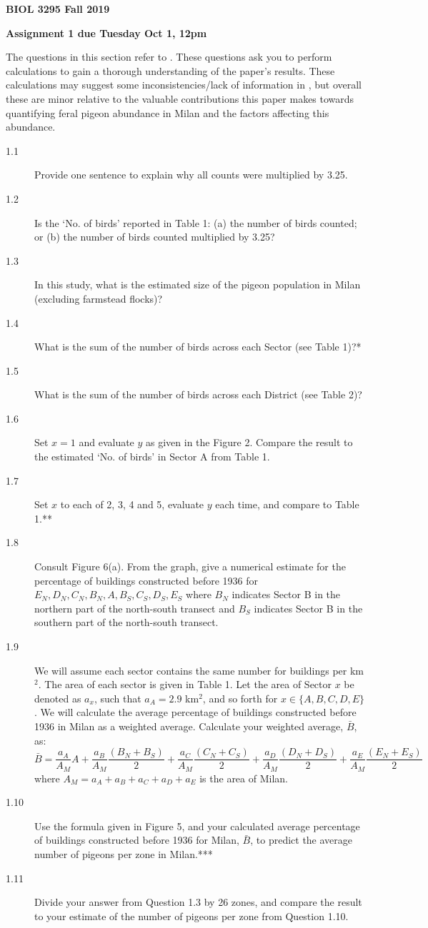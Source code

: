 \documentclass[11pt, oneside]{article}   	%
\begin{document}
\textbf{BIOL 3295 Fall 2019}

\textbf{Assignment 1 due Tuesday Oct 1, 12pm}

The questions in this section refer to \cite{Sacchi}. These questions ask you to perform calculations to gain a thorough understanding of the paper's results. These calculations may suggest some inconsistencies/lack of information in \cite{Sacchi}, but overall these are minor relative to the valuable contributions this paper makes towards quantifying feral pigeon abundance in Milan and the factors affecting this abundance. 

\begin{description}
\item[1.1] Provide one sentence to explain why all counts were multiplied by 3.25.
\item[1.2] Is the `No. of birds' reported in Table 1: (a) the number of birds counted; or (b) the number of birds counted multiplied by 3.25?
\item[1.3] In this study, what is the estimated size of the pigeon population in Milan (excluding farmstead flocks)?
\item[1.4] What is the sum of the number of birds across each Sector (see Table 1)?*
\item[1.5] What is the sum of the number of birds across each District (see Table 2)? 
\item[1.6] Set $x = 1$ and evaluate $y$ as given in the Figure 2. Compare the result to the estimated `No. of birds' in Sector A from Table 1.
\item[1.7] Set $x$ to each of 2, 3, 4 and 5, evaluate $y$ each time, and compare to Table 1.**
\item[1.8] Consult Figure 6(a). From the graph, give a numerical estimate for the percentage of buildings constructed before 1936 for $E_N, D_N, C_N, B_N, A, B_S, C_S, D_S, E_S$ where $B_N$ indicates Sector B in the northern part of the north-south transect and $B_S$ indicates Sector B in the southern part of the north-south transect.
\item[1.9] We will assume each sector contains the same number for buildings per km$^2$. The area of each sector is given in Table 1. Let the area of Sector $x$ be denoted as $a_x$, such that $a_A = 2.9$ km$^2$, and so forth for $x \in \{A, B, C, D, E\}$.  We will calculate the average percentage of buildings constructed before 1936 in Milan as a weighted average. Calculate your weighted average, $\bar{B}$, as:
\[\bar{B} = \frac{a_A}{A_M}A+\frac{a_B}{A_M}\frac{(B_N+B_S)}{2}+\frac{a_C}{A_M}\frac{(C_N+C_S)}{2}+\frac{a_D}{A_M}\frac{(D_N+D_S)}{2}+\frac{a_E}{A_M}\frac{(E_N+E_S)}{2}\]
where $A_M = a_A+ a_B + a_C + a_D + a_E$ is the area of Milan. 
\item[1.10] Use the formula given in Figure 5, and your calculated average percentage of buildings constructed before 1936 for Milan, $\bar{B}$, to predict the average number of pigeons per zone in Milan.***
\item[1.11] Divide your answer from Question 1.3 by 26 zones, and compare the result to your estimate of the number of pigeons per zone from Question 1.10.
\end{description}
\end{document}

